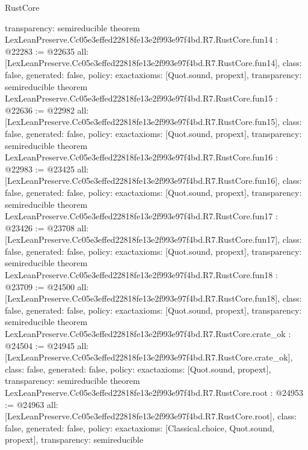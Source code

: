 \begin{lexlean}{RustCore}
\begin{coremodule}
{  transparency: semireducible
}
theorem LexLeanPreserve.Cc05e3effed22818fe13e2f993e97f4bd.R7.RustCore.fun14 : @22283 := @22635 {
  all: [LexLeanPreserve.Cc05e3effed22818fe13e2f993e97f4bd.R7.RustCore.fun14],
  class: false,
  generated: false,
  policy: exact{axioms: [Quot.sound, propext]},
  transparency: semireducible
}
theorem LexLeanPreserve.Cc05e3effed22818fe13e2f993e97f4bd.R7.RustCore.fun15 : @22636 := @22982 {
  all: [LexLeanPreserve.Cc05e3effed22818fe13e2f993e97f4bd.R7.RustCore.fun15],
  class: false,
  generated: false,
  policy: exact{axioms: [Quot.sound, propext]},
  transparency: semireducible
}
theorem LexLeanPreserve.Cc05e3effed22818fe13e2f993e97f4bd.R7.RustCore.fun16 : @22983 := @23425 {
  all: [LexLeanPreserve.Cc05e3effed22818fe13e2f993e97f4bd.R7.RustCore.fun16],
  class: false,
  generated: false,
  policy: exact{axioms: [Quot.sound, propext]},
  transparency: semireducible
}
theorem LexLeanPreserve.Cc05e3effed22818fe13e2f993e97f4bd.R7.RustCore.fun17 : @23426 := @23708 {
  all: [LexLeanPreserve.Cc05e3effed22818fe13e2f993e97f4bd.R7.RustCore.fun17],
  class: false,
  generated: false,
  policy: exact{axioms: [Quot.sound, propext]},
  transparency: semireducible
}
theorem LexLeanPreserve.Cc05e3effed22818fe13e2f993e97f4bd.R7.RustCore.fun18 : @23709 := @24500 {
  all: [LexLeanPreserve.Cc05e3effed22818fe13e2f993e97f4bd.R7.RustCore.fun18],
  class: false,
  generated: false,
  policy: exact{axioms: [Quot.sound, propext]},
  transparency: semireducible
}
theorem LexLeanPreserve.Cc05e3effed22818fe13e2f993e97f4bd.R7.RustCore.crate_ok : @24504 := @24945 {
  all: [LexLeanPreserve.Cc05e3effed22818fe13e2f993e97f4bd.R7.RustCore.crate_ok],
  class: false,
  generated: false,
  policy: exact{axioms: [Quot.sound, propext]},
  transparency: semireducible
}
theorem LexLeanPreserve.Cc05e3effed22818fe13e2f993e97f4bd.R7.RustCore.root : @24953 := @24963 {
  all: [LexLeanPreserve.Cc05e3effed22818fe13e2f993e97f4bd.R7.RustCore.root],
  class: false,
  generated: false,
  policy: exact{axioms: [Classical.choice, Quot.sound, propext]},
  transparency: semireducible
}


\end{coremodule}
\end{lexlean}
